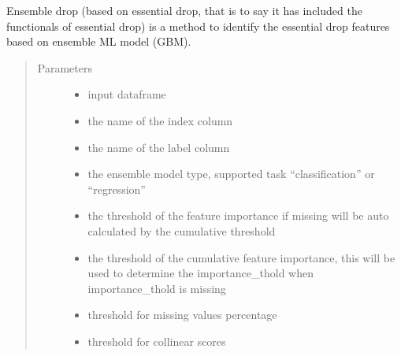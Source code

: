 \documentclass[letterpaper,11pt,english]{sphinxmanual}
\begin{document}
\begin{fulllineitems}
\begin{fulllineitems}
\label{\detokenize{auto_feature:AutoFeatures.AutoFeatures.ensemble_drop}}
Ensemble drop (based on essential drop, that is to say it has included the functionals of essential drop) is a
method to identify the essential drop features based on ensemble ML model (GBM).
\begin{quote}\begin{description}
\item[{Parameters}] \leavevmode\begin{itemize}
\item {} 
 \textendash{} input dataframe

\item {} 
 \textendash{} the name of the index column

\item {} 
 \textendash{} the name of the label column

\item {} 
 \textendash{} the ensemble model type, supported task “classification” or “regression”

\item {} 
 \textendash{} the threshold of the feature importance if missing will be auto calculated by the
cumulative threshold

\item {} 
 \textendash{} the threshold of the cumulative feature importance, this will be used to determine
the importance\_thold when importance\_thold is missing

\item {} 
 \textendash{} threshold for missing values percentage

\item {} 
 \textendash{} threshold for collinear scores


\end{itemize}
\end{description}
\end{quote}
\end{fulllineitems}
\end{fulllineitems}
\end{document}
